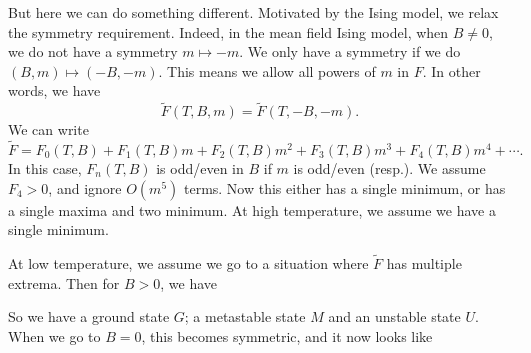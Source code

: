 \documentclass[a4paper]{article}
\begin{document}
But here we can do something different. Motivated by the Ising model, we relax the symmetry requirement. Indeed, in the mean field Ising model, when $B \not= 0$, we do not have a symmetry $m \mapsto -m$. We only have a symmetry if we do $(B, m) \mapsto (-B, -m)$. This means we allow all powers of $m$ in $F$. In other words, we have
\[
  \tilde{F}(T, B, m) = \tilde{F}(T, -B, -m).
\]
We can write
\[
  \tilde{F} = F_0(T, B) + F_1(T, B)m + F_2(T, B) m^2 + F_3(T, B) m^3 + F_4(T, B)m^4 + \cdots.
\]
In this case, $F_n(T, B)$ is odd/even in $B$ if $m$ is odd/even (resp.). We assume $F_4 > 0$, and ignore $O(m^5)$ terms. Now this either has a single minimum, or has a single maxima and two minimum. At high temperature, we assume we have a single minimum.
\begin{center}
\end{center}
At low temperature, we assume we go to a situation where $\tilde{F}$ has multiple extrema. Then for $B > 0$, we have
\begin{center}
\end{center}
So we have a ground state $G$; a metastable state $M$ and an unstable state $U$. When we go to $B = 0$, this becomes symmetric, and it now looks like
\begin{center}
\end{center}
\end{document}

